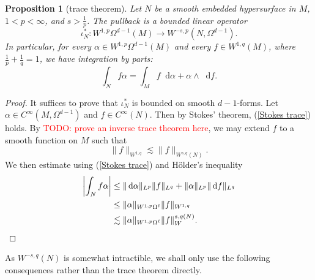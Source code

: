 \documentclass[reqno,11pt]{amsart}
\newcommand*\dif{\mathop{}\!\mathrm{d}}
\newtheorem{proposition}[theorem]{Proposition}
\theoremstyle{definition}
\numberwithin{equation}{section}
\newcommand\todo[1]{\textcolor{red}{TODO: #1}}
\begin{document}
\begin{proposition}[trace theorem]
Let $N$ be a smooth embedded hypersurface in $M$, $1 < p < \infty$, and $s > \frac{1}{p}$.
The pullback is a bounded linear operator 
$$\iota^*_N: W^{1, p} \Omega^{d - 1}(M) \to W^{-s, p}(N, \Omega^{d - 1}).$$
In particular, for every $\alpha \in W^{1, p} \Omega^{d - 1}(M)$ and every $f \in W^{1, q}(M)$, where $\frac{1}{p} + \frac{1}{q} = 1$, we have integration by parts:
\begin{equation}\label{Stokes trace}
	\int_N f\alpha = \int_M f \dif \alpha + \alpha \wedge \dif f.
\end{equation}
\end{proposition}
\begin{proof}
It suffices to prove that $\iota^*_N$ is bounded on smooth $d - 1$-forms.
Let $\alpha \in C^\infty(M, \Omega^{d - 1})$ and $f \in C^\infty(N)$.
Then by Stokes' theorem, (\ref{Stokes trace}) holds.
By \todo{prove an inverse trace theorem here}, we may extend $f$ to a smooth function on $M$ such that
$$\|f\|_{W^{1, q}} \lesssim \|f\|_{W^{s, q}(N)}.$$
We then estimate using (\ref{Stokes trace}) and H\"older's inequality
\begin{align*}
\left|\int_N f\alpha \right|
&\leq \|\dif \alpha\|_{L^p} \|f\|_{L^q} + \|\alpha\|_{L^p} \|\dif f\|_{L^q} \\
&\leq \|\alpha\|_{W^{1, p} \Omega^\ell} \|f\|_{W^{1, q}} \\
&\lesssim \|\alpha\|_{W^{1, p} \Omega^\ell} \|f\|_W^{{s, q}(N)}. \qedhere
\end{align*}
\end{proof}

As $W^{-s, q}(N)$ is somewhat intractible, we shall only use the following consequences rather than the trace theorem directly.
\end{document}
